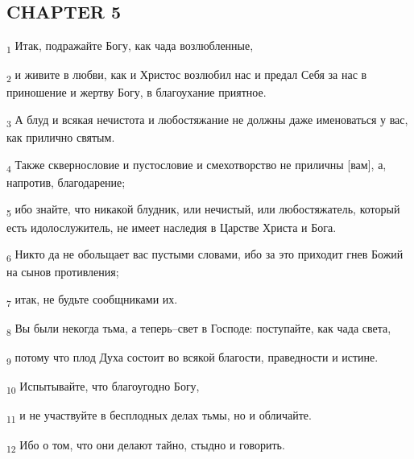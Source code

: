 \subsection{CHAPTER 5}
\begin{tcolorbox}
\textsubscript{1} Итак, подражайте Богу, как чада возлюбленные,
\end{tcolorbox}
\begin{tcolorbox}
\textsubscript{2} и живите в любви, как и Христос возлюбил нас и предал Себя за нас в приношение и жертву Богу, в благоухание приятное.
\end{tcolorbox}
\begin{tcolorbox}
\textsubscript{3} А блуд и всякая нечистота и любостяжание не должны даже именоваться у вас, как прилично святым.
\end{tcolorbox}
\begin{tcolorbox}
\textsubscript{4} Также сквернословие и пустословие и смехотворство не приличны [вам], а, напротив, благодарение;
\end{tcolorbox}
\begin{tcolorbox}
\textsubscript{5} ибо знайте, что никакой блудник, или нечистый, или любостяжатель, который есть идолослужитель, не имеет наследия в Царстве Христа и Бога.
\end{tcolorbox}
\begin{tcolorbox}
\textsubscript{6} Никто да не обольщает вас пустыми словами, ибо за это приходит гнев Божий на сынов противления;
\end{tcolorbox}
\begin{tcolorbox}
\textsubscript{7} итак, не будьте сообщниками их.
\end{tcolorbox}
\begin{tcolorbox}
\textsubscript{8} Вы были некогда тьма, а теперь--свет в Господе: поступайте, как чада света,
\end{tcolorbox}
\begin{tcolorbox}
\textsubscript{9} потому что плод Духа состоит во всякой благости, праведности и истине.
\end{tcolorbox}
\begin{tcolorbox}
\textsubscript{10} Испытывайте, что благоугодно Богу,
\end{tcolorbox}
\begin{tcolorbox}
\textsubscript{11} и не участвуйте в бесплодных делах тьмы, но и обличайте.
\end{tcolorbox}
\begin{tcolorbox}
\textsubscript{12} Ибо о том, что они делают тайно, стыдно и говорить.
\end{tcolorbox}
